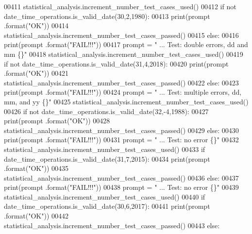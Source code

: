 \begin{DoxyCode}
00411         statistical\_analysis.increment\_number\_test\_cases\_used()
00412         \textcolor{keywordflow}{if} \textcolor{keywordflow}{not} date\_time\_operations.is\_valid\_date(30,2,1980):
00413             print(prompt .format(\textcolor{stringliteral}{"OK"}))
00414             statistical\_analysis.increment\_number\_test\_cases\_passed()
00415         \textcolor{keywordflow}{else}:
00416             print(prompt .format(\textcolor{stringliteral}{"FAIL!!!"}))
00417         prompt = \textcolor{stringliteral}{"  ... Test: double errors, dd and mm          \{\}"}
00418         statistical\_analysis.increment\_number\_test\_cases\_used()
00419         \textcolor{keywordflow}{if} \textcolor{keywordflow}{not} date\_time\_operations.is\_valid\_date(31,4,2018):
00420             print(prompt .format(\textcolor{stringliteral}{"OK"}))
00421             statistical\_analysis.increment\_number\_test\_cases\_passed()
00422         \textcolor{keywordflow}{else}:
00423             print(prompt .format(\textcolor{stringliteral}{"FAIL!!!"}))
00424         prompt = \textcolor{stringliteral}{"  ... Test: multiple errors, dd, mm, and yy       \{\}"}
00425         statistical\_analysis.increment\_number\_test\_cases\_used()
00426         \textcolor{keywordflow}{if} \textcolor{keywordflow}{not} date\_time\_operations.is\_valid\_date(32,-4,1988):
00427             print(prompt .format(\textcolor{stringliteral}{"OK"}))
00428             statistical\_analysis.increment\_number\_test\_cases\_passed()
00429         \textcolor{keywordflow}{else}:
00430             print(prompt .format(\textcolor{stringliteral}{"FAIL!!!"}))
00431         prompt = \textcolor{stringliteral}{"  ... Test: no error                  \{\}"}
00432         statistical\_analysis.increment\_number\_test\_cases\_used()
00433         \textcolor{keywordflow}{if} date\_time\_operations.is\_valid\_date(31,7,2015):
00434             print(prompt .format(\textcolor{stringliteral}{"OK"}))
00435             statistical\_analysis.increment\_number\_test\_cases\_passed()
00436         \textcolor{keywordflow}{else}:
00437             print(prompt .format(\textcolor{stringliteral}{"FAIL!!!"}))
00438         prompt = \textcolor{stringliteral}{"  ... Test: no error                  \{\}"}
00439         statistical\_analysis.increment\_number\_test\_cases\_used()
00440         \textcolor{keywordflow}{if} date\_time\_operations.is\_valid\_date(30,6,2017):
00441             print(prompt .format(\textcolor{stringliteral}{"OK"}))
00442             statistical\_analysis.increment\_number\_test\_cases\_passed()
00443         \textcolor{keywordflow}{else}:

\end{DoxyCode}
